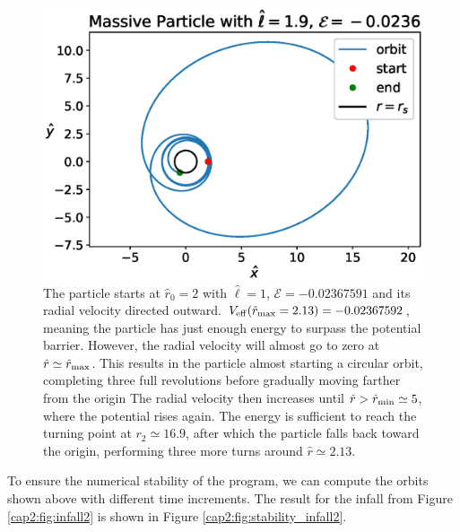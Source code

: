\begin{figure}[h!]
    \centering
    \includegraphics[width= 0.64 \textwidth]{Figures/chapter2/volevi.eps}
    \caption{The particle starts at $\hat r_0 = 2$ with $\hat \ell = 1$,
    $\mathcal E = -0.02367591$ and its radial velocity directed outward.
    $V_{\rm eff} (\hat r_{\rm max} = 2.13) = -0.02367592$, meaning the particle
    has just enough energy to surpass the potential barrier.
    However, the radial velocity will almost go to zero at
    $\hat r \simeq \hat r_{\rm max}$.
    This results in the particle almost starting a circular orbit, completing
    three full revolutions before gradually moving farther from the origin
    The radial velocity then increases until
    $\hat r > \hat r_{\rm min} \simeq 5$, where the potential rises again.
    The energy is sufficient to reach the turning point at $r_2 \simeq 16.9$,
    after which the particle falls back toward the origin, performing three more
    turns around $\hat r \simeq 2.13$.}
    \label{cap2:fig:volevi}
\end{figure}

To ensure the numerical stability of the program, we can compute the orbits
shown above with different time increments.
The result for the infall from Figure \ref{cap2:fig:infall2} is shown in Figure
\ref{cap2:fig:stability_infall2}.

